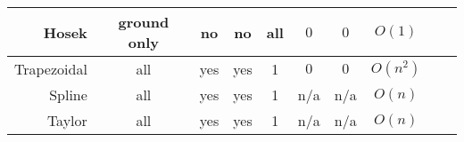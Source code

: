 \begin{table*}[ht!]
\begin{tabular}{|r||c|c|c|c|c|c|c|c|c|}
\hline
Hosek & ground only & no & no & all & $0$ & $0$ & $O(1)$ &
 \\
\hline
Trapezoidal & all & yes & yes & 1 & $0$ & $0$ & $O(n^2)$ &
 &
 \\
\hline
Spline & all & yes & yes & 1 & n/a & n/a & $O(n)$ &
 &
 \\
\hline
Taylor & all & yes & yes & 1 & n/a & n/a & $O(n)$ &
 &
 \\
\hline
\end{tabular}
\end{table*}

